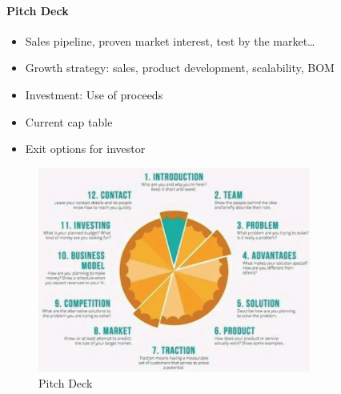 \paragraph{Pitch Deck}
\begin{itemize}
    \item Sales pipeline, proven market interest, test by the market\dots
    \item Growth strategy: sales, product development, scalability, BOM
    \item Investment: Use of proceeds
    \item Current cap table
    \item Exit options for investor
\end{itemize}

\begin{figure}[h]
    \centering
    \includegraphics[width=0.8\textwidth]{Pictures/12_slides_of_a_pitch_deck.png}
    \caption{Pitch Deck}
\end{figure}

